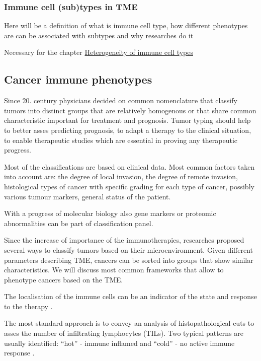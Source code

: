 \documentclass[12pt,]{book}
\theoremstyle{definition}
\theoremstyle{definition}
\theoremstyle{definition}
\theoremstyle{remark}
\begin{document}
\hypertarget{immune-cell-subtypes-in-tme}{%
\subsubsection{Immune cell (sub)types in
TME}\label{immune-cell-subtypes-in-tme}}

Here will be a definition of what is immune cell type, how different
phenotypes are can be associated with subtypes and why researches do it

Necessary for the chapter \protect\hyperlink{map}{Heterogeneity of
immune cell types}

\hypertarget{cancer-immune-phenotypes}{%
\subsection{Cancer immune phenotypes}\label{cancer-immune-phenotypes}}

Since 20. century physicians decided on common nomenclature that
classify tumors into distinct groups that are relatively homogenous or
that share common characteristic important for treatment and prognosis.
Tumor typing should help to better asses predicting prognosis, to adapt
a therapy to the clinical situation, to enable therapeutic studies which
are essential in proving any therapeutic progress.

Most of the classifications are based on clinical data. Most common
factors taken into account are: the degree of local invasion, the degree
of remote invasion, histological types of cancer with specific grading
for each type of cancer, possibly various tumour markers, general status
of the patient.

With a progress of molecular biology also gene markers or proteomic
abnormalities can be part of classification panel.

Since the increase of importance of the immunotherapies, researches
proposed several ways to classify tumors based on their
microenvironment. Given different parameters describing TME, cancers can
be sorted into groups that show similar characteristics. We will discuss
most common frameworks that allow to phenotype cancers based on the TME.

The localisation of the immune cells can be an indicator of the state
and response to the therapy \citep{Bindea2013}.

The most standard approach is to convey an analysis of histopathological
cuts to asses the number of infiltrating lymphocytes (TILs). Two typical
patterns are usually identified: ``hot'' - immune inflamed and ``cold''
- no active immune response \citep{Berghoff2018}.
\end{document}
